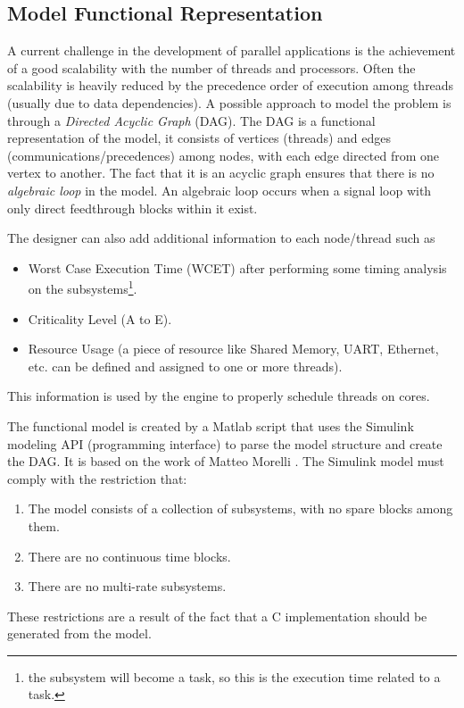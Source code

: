 \subsection{Model Functional Representation}
A current challenge in the development of parallel applications is the achievement of a good scalability with the number of threads and processors. Often the scalability is heavily reduced by the precedence order of execution among threads (usually due to data dependencies). A possible approach to model the problem is through a \emph{Directed Acyclic Graph} (DAG). The DAG is a functional representation of the model, it consists of vertices (threads) and edges (communications/precedences) among nodes, with each edge directed from one vertex to another. The fact that it is an acyclic graph ensures that there is no \emph{algebraic loop} in the model. An algebraic loop occurs when a signal loop with only direct feedthrough blocks within it exist.
\par The designer can also add additional information to each node/thread such as
\begin{itemize}
\item Worst Case Execution Time (WCET) after performing some timing analysis on the subsystems\footnote{the subsystem will become a task, so this is the execution time related to a task.}. 
\item Criticality Level (A to E).
\item Resource Usage (a piece of resource like Shared Memory, UART, Ethernet, etc. can be defined and assigned to one or more threads).
\end{itemize}
This information is used by the engine to properly schedule threads on cores.
\par The functional model is created by a Matlab script that uses the Simulink modeling API (programming interface) to parse the model structure and create the DAG. It is based on the work of Matteo Morelli \cite{MorelliSee}. The Simulink model must comply with the restriction that:
\begin{enumerate}
\item The model consists of a collection of subsystems, with no spare blocks among them.
\item There are no continuous time blocks.
\item There are no multi-rate subsystems.
\end{enumerate}
These restrictions are a result of the fact that a C implementation should be generated from the model. 

